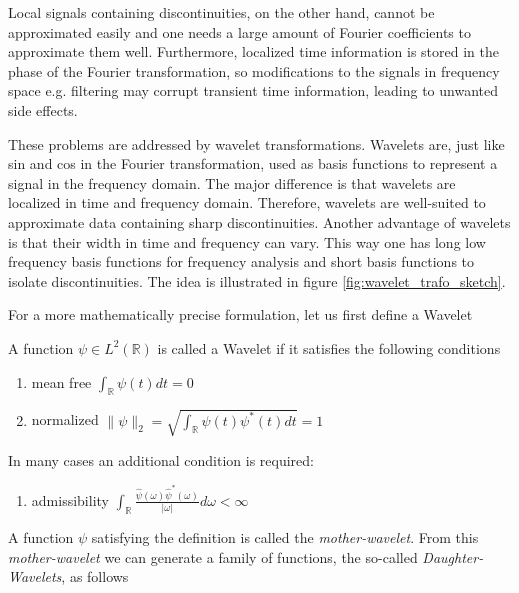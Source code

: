 Local signals containing discontinuities, on the other hand, cannot be approximated easily and one needs a large amount of Fourier coefficients to approximate them well.
Furthermore, localized time information is stored in the phase of the Fourier transformation, so modifications to the signals in frequency space
e.g. filtering may corrupt transient time information, leading to unwanted side effects.

These problems are addressed by wavelet transformations. Wavelets are, just like sin and cos in the Fourier transformation, used as basis functions
to represent a signal in the frequency domain. The major difference is that wavelets are localized in time and frequency domain. 
Therefore, wavelets are well-suited to approximate data containing sharp discontinuities. 
Another advantage of wavelets is that their width in time and frequency can vary.
This way one has long low frequency basis functions for frequency analysis and short basis functions to isolate discontinuities. The idea is illustrated
in figure \ref{fig:wavelet_trafo_sketch}.



For a more mathematically precise formulation, let us first define a Wavelet

\begin{definition}[Wavelet]
    A function $\psi \in L^{2}(\mathbb{R})$ is called a Wavelet if it satisfies the following conditions

    \begin{enumerate}
        \item mean free $\int_{\mathbb{R}} \psi (t) dt = 0$
        \item normalized $\|\psi \|_2 = \sqrt{\int_{\mathbb{R}} \psi(t) \psi^{\ast}(t) dt} = 1$
        \end{enumerate}%
        In many cases an additional condition is required:
        \begin{enumerate}[resume*]
        \item admissibility $\int_{\mathbb{R}} \frac{\hat{\psi}(\omega) \hat{\psi}^{\ast}(\omega)}{|\omega|} d\omega < \infty$
    \end{enumerate}
    \label{def:wavelet}
\end{definition}

A function $\psi$ satisfying the definition is called the \textit{mother-wavelet}. From this \textit{mother-wavelet} we can generate a family of functions, the so-called 
\textit{Daughter-Wavelets}, as follows

